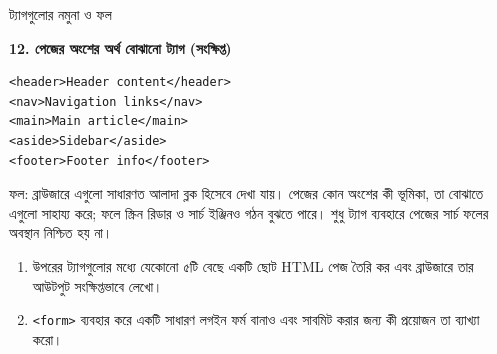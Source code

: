 \begin{examplebox}{ট্যাগগুলোর নমুনা ও ফল}
\vspace{6pt}
\par\noindent\begin{minipage}{\linewidth}
\textbf{12. পেজের অংশের অর্থ বোঝানো ট্যাগ (সংক্ষিপ্ত)}\par
\begin{minipage}[t]{.50\linewidth}\vspace{0pt}
\begin{verbatim}
<header>Header content</header>
<nav>Navigation links</nav>
<main>Main article</main>
<aside>Sidebar</aside>
<footer>Footer info</footer>
\end{verbatim}
\end{minipage}\hfill
\begin{minipage}[t]{.46\linewidth}\vspace{0pt}
ফল: ব্রাউজারে এগুলো সাধারণত আলাদা ব্লক হিসেবে দেখা যায়। পেজের কোন অংশের কী ভূমিকা, তা বোঝাতে এগুলো সাহায্য করে; ফলে স্ক্রিন রিডার ও সার্চ ইঞ্জিনও গঠন বুঝতে পারে। শুধু ট্যাগ ব্যবহারে পেজের সার্চ ফলের অবস্থান নিশ্চিত হয় না।
\end{minipage}

\end{minipage}\par


\end{examplebox}

\begin{practicebox}
\begin{enumerate}
\item উপরের ট্যাগগুলোর মধ্যে যেকোনো ৫টি বেছে একটি ছোট HTML পেজ তৈরি কর এবং ব্রাউজারে তার আউটপুট সংক্ষিপ্তভাবে লেখো।
\item \texttt{<form>} ব্যবহার করে একটি সাধারণ লগইন ফর্ম বানাও এবং সাবমিট করার জন্য কী প্রয়োজন তা ব্যাখ্যা করো।
\end{enumerate}
\end{practicebox}
